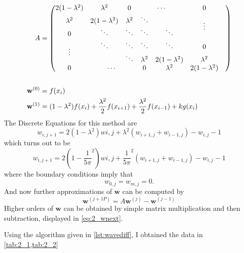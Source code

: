 \documentclass[12pt]{article}
\begin{document}
\begin{equation}
  \label{eq:2_A}
  \begin{aligned}
    A &=
    \begin{pmatrix}
      2(1-\lambda^2) & \lambda^2    & 0       & \multicolumn{2}{c}{\cdots} & 0 \\
      \lambda^2    & 2(1-\lambda^2) & \lambda^2 & \ddots &  & \multirow{2}{*}{\vdots} \\
      0 & \ddots & \ddots & \ddots & \ddots & & \\
      \multirow{2}{*}{\vdots} & \ddots & \ddots & \ddots & \ddots & 0 \\
      & & \ddots & \lambda^2 & 2(1-\lambda^2) & \lambda^2 \\
      0 & \multicolumn{2}{c}{\cdots} & 0 & \lambda^2 & 2(1-\lambda^2) \\
    \end{pmatrix} \\
    \\
    \mathbf{w}^{(0)} &= f(x_i) \\
    \mathbf{w}^{(1)} &=
    (1-\lambda^2)f(x_i)+\frac{\lambda^2}{2}f(x_{i+1}) +
    \frac{\lambda^2}{2}f(x_{i-1}) + kg(x_i)
  \end{aligned}
\end{equation}
The Discrete Equations for this method are 
\begin{equation}
  \label{eq:2_dis}
  w_{i,j+1} = 2(1-\lambda^2)w{i,j} +
  \lambda^2(w_{i+1,j}+w_{i-1,j})-w_{i,j}-1 
\end{equation}
which turns out to be
\begin{equation}
  \label{eq:2_dis_val}
  w_{i,j+1} = 2(1-\frac{1}{5\pi}^2)w{i,j} +
  \frac{1}{5\pi}^2(w_{i+1,j}+w_{i-1,j})-w_{i,j}-1 
\end{equation}
where the boundary conditions imply that
\begin{equation}
  \label{eq:2_bound}
  w_{0,j} = w_{m,j} = 0.
\end{equation}
And now further approximations of $\mathbf{w}$ can be computed by
\begin{equation}
  \label{eq:2_wnext}
  \mathbf{w}^{(j+1P)} = A\mathbf{w}^{(j)} - \mathbf{w}^{(j-1)}
\end{equation}
Higher orders of $\mathbf{w}$ can be obtained by simple matrix
multiplication and then subtraction, displayed in \cref{eq:2_wnext}.

Using the algorithm given in \cref{lst:wavediff}, I obtained the data
in \cref{tab:2_1,tab:2_2}
\end{document}
